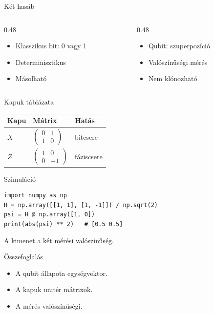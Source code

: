 \documentclass[10pt]{beamer}
\begin{document}
\begin{frame}{Két hasáb}
\begin{columns}[t]
\begin{column}{0.48\textwidth}
\begin{itemize}\item Klasszikus bit: 0 vagy 1\item Determinisztikus\item Másolható\end{itemize}
\end{column}
\begin{column}{0.48\textwidth}
\begin{itemize}\item Qubit: szuperpozíció\item Valószínűségi mérés\item Nem klónozható\end{itemize}
\end{column}
\end{columns}
\end{frame}

\begin{frame}{Kapuk táblázata}
\begin{tabular}{lll}\toprule Kapu & Mátrix & Hatás \\ \midrule
$X$ & $\begin{pmatrix}0&1\\1&0\end{pmatrix}$ & bitcsere \\
$Z$ & $\begin{pmatrix}1&0\\0&-1\end{pmatrix}$ & fáziscsere \\ \bottomrule\end{tabular}
\end{frame}

\begin{frame}[fragile]{Szimuláció}
\begin{lstlisting}
import numpy as np
H = np.array([[1, 1], [1, -1]]) / np.sqrt(2)
psi = H @ np.array([1, 0])
print(abs(psi) ** 2)   # [0.5 0.5]
\end{lstlisting}
A kimenet a két mérési valószínűség.
\end{frame}

\begin{frame}{Összefoglalás}
\begin{itemize}\item A qubit állapota egységvektor.\pause \item A kapuk unitér mátrixok.\pause \item A mérés valószínűségi.\end{itemize}
\end{frame}
\end{document}
